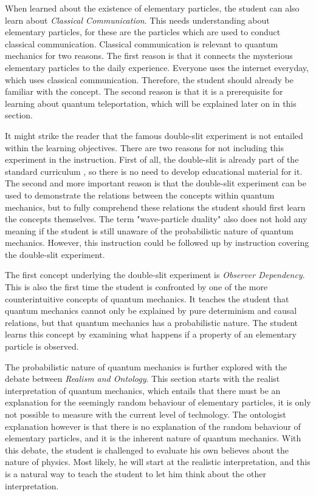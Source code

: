 \documentclass[11pt,twoside]{report} %
\begin{document}
When learned about the existence of elementary particles, the student can also learn about \emph{Classical Communication}. This needs understanding about elementary particles, for these are the particles which are used to conduct classical communication. Classical communication is relevant to quantum mechanics for two reasons. The first reason is that it connects the mysterious elementary particles to the daily experience. Everyone uses the internet everyday, which uses classical communication. Therefore, the student should already be familiar with the concept. The second reason is that it is a prerequisite for learning about quantum teleportation, which will be explained later on in this section.

It might strike the reader that the famous double-slit experiment is not entailed within the learning objectives. There are two reasons for not including this experiment in the instruction. First of all, the double-slit is already part of the standard curriculum \cite{eindexamen2015}, so there is no need to develop educational material for it. The second and more important reason is that the double-slit experiment can be used to demonstrate the relations between the concepts within quantum mechanics, but to fully comprehend these relations the student should first learn the concepts themselves. The term "wave-particle duality" also does not hold any meaning if the student is still unaware of the probabilistic nature of quantum mechanics. However, this instruction could be followed up by instruction covering the double-slit experiment.

The first concept underlying the double-slit experiment is \emph{Observer Dependency}. This is also the first time the student is confronted by one of the more counterintuitive concepts of quantum mechanics. It teaches the student that quantum mechanics cannot only be explained by pure determinism and causal relations, but that quantum mechanics has a probabilistic nature. The student learns this concept by examining what happens if a property of an elementary particle is observed.

The probabilistic nature of quantum mechanics is further explored with the debate between \emph{Realism and Ontology}. This section starts with the realist interpretation of quantum mechanics, which entails that there must be an explanation for the seemingly random behaviour of elementary particles, it is only not possible to measure with the current level of technology. The ontologist explanation however is that there is no explanation of the random behaviour of elementary particles, and it is the inherent nature of quantum mechanics. With this debate, the student is challenged to evaluate his own believes about the nature of physics. Most likely, he will start at the realistic interpretation, and this is a natural way to teach the student to let him think about the other interpretation.
\end{document}
